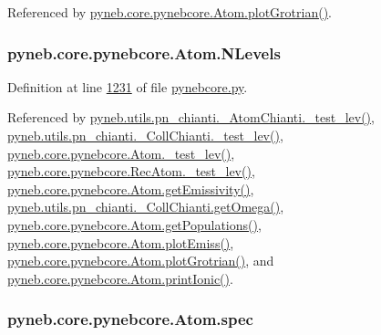 Referenced by \hyperlink{pynebcore_8py_source_l02443}{pyneb.\-core.\-pynebcore.\-Atom.\-plot\-Grotrian()}.

\hypertarget{classpyneb_1_1core_1_1pynebcore_1_1_atom_a6b43c1e6431a6786c1b4267f704fb4e8}{
\subsubsection[{N\-Levels}]{\setlength{\rightskip}{0pt plus 5cm}pyneb.\-core.\-pynebcore.\-Atom.\-N\-Levels}}\label{classpyneb_1_1core_1_1pynebcore_1_1_atom_a6b43c1e6431a6786c1b4267f704fb4e8}


Definition at line \hyperlink{pynebcore_8py_source_l01231}{1231} of file \hyperlink{pynebcore_8py_source}{pynebcore.\-py}.



Referenced by \hyperlink{pn__chianti_8py_source_l00304}{pyneb.\-utils.\-pn\-\_\-chianti.\-\_\-\-Atom\-Chianti.\-\_\-test\-\_\-lev()}, \hyperlink{pn__chianti_8py_source_l00472}{pyneb.\-utils.\-pn\-\_\-chianti.\-\_\-\-Coll\-Chianti.\-\_\-test\-\_\-lev()}, \hyperlink{pynebcore_8py_source_l01525}{pyneb.\-core.\-pynebcore.\-Atom.\-\_\-test\-\_\-lev()}, \hyperlink{pynebcore_8py_source_l02672}{pyneb.\-core.\-pynebcore.\-Rec\-Atom.\-\_\-test\-\_\-lev()}, \hyperlink{pynebcore_8py_source_l01782}{pyneb.\-core.\-pynebcore.\-Atom.\-get\-Emissivity()}, \hyperlink{pn__chianti_8py_source_l00507}{pyneb.\-utils.\-pn\-\_\-chianti.\-\_\-\-Coll\-Chianti.\-get\-Omega()}, \hyperlink{pynebcore_8py_source_l01562}{pyneb.\-core.\-pynebcore.\-Atom.\-get\-Populations()}, \hyperlink{pynebcore_8py_source_l02384}{pyneb.\-core.\-pynebcore.\-Atom.\-plot\-Emiss()}, \hyperlink{pynebcore_8py_source_l02443}{pyneb.\-core.\-pynebcore.\-Atom.\-plot\-Grotrian()}, and \hyperlink{pynebcore_8py_source_l02233}{pyneb.\-core.\-pynebcore.\-Atom.\-print\-Ionic()}.

\hypertarget{classpyneb_1_1core_1_1pynebcore_1_1_atom_a02c0f7146a2f5b8eac765a453c763797}{
\subsubsection[{spec}]{\setlength{\rightskip}{0pt plus 5cm}pyneb.\-core.\-pynebcore.\-Atom.\-spec}}\label{classpyneb_1_1core_1_1pynebcore_1_1_atom_a02c0f7146a2f5b8eac765a453c763797}


